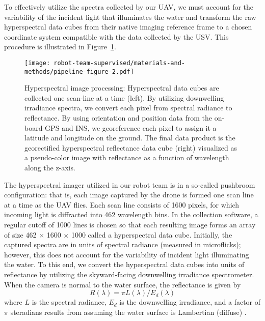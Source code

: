 To effectively utilize the spectra collected by our UAV, we must account for the variability of the incident light that illuminates the water and transform the raw hyperspectral data cubes from their native imaging reference frame to a chosen coordinate system compatible with the data collected by the USV. This procedure is illustrated in Figure~\ref{fig:hsi-pipeline}.

\begin{figure}[H]
\vspace{-0.3in}
\hspace{-6pt}\texttt{[image: robot-team-supervised/materials-and-methods/pipeline-figure-2.pdf]}
\vspace{-0.4in}
\caption{Hyperspectral image processing: Hyperspectral data cubes are collected one scan-line at a time (left). By utilizing downwelling irradiance spectra, we convert each pixel from spectral radiance to reflectance. By using orientation and position data from the on-board GPS and INS, we georeference each pixel to assign it a latitude and longitude on the ground. The final data product is the georectified hyperspectral reflectance data cube (right) visualized as a pseudo-color image with reflectance  as a function of wavelength along the z-axis.\label{fig:hsi-pipeline}}
\end{figure}  

The hyperspectral imager utilized in our robot team is in a so-called pushbroom configuration: that is, each image captured by the drone is formed one scan line at a time as the UAV flies. Each scan line consists of 1600 pixels, for which incoming light is diffracted into 462 wavelength bins. In the collection software, a regular cutoff of 1000 lines is chosen so that each resulting image forms an array of size 462 $\times$ 1600 $\times$ 1000 called a hyperspectral data cube. Initially, the captured spectra are in units of spectral radiance (measured in microflicks); however, this does not account for the variability of incident light illuminating the water. To this end, we convert the hyperspectral data cubes into units of reflectance by utilizing the skyward-facing downwelling irradiance spectrometer. When the camera is normal to the water surface, the reflectance is given by
\begin{equation}
    R(\lambda) = \pi L(\lambda)/E_d(\lambda)
\end{equation}
where $L$ is the spectral radiance, $E_d$ is the downwelling irradiance, and a factor of $\pi$ steradians results from assuming the water surface is Lambertian (diffuse) \cite{reflectance-conversion}. 

